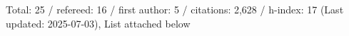 Total: 25 / refereed: 16 / first author: 5 / citations: 2,628 / h-index: 17 (Last updated: 2025-07-03), List attached below